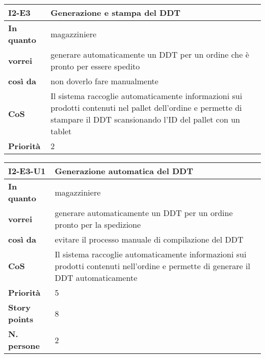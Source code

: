 \begin{table}[H]
  \begin{tabularx}{\textwidth}{lX}
    \toprule
    \textbf{I2-E3} & \textbf{Generazione e stampa del DDT} \\
    \midrule
    \textbf{In quanto} & magazziniere \\
    \textbf{vorrei} & generare automaticamente un DDT per un ordine che è pronto per essere spedito \\
    \textbf{così da} & non doverlo fare manualmente \\
    \midrule
    \textbf{CoS} & Il sistema raccoglie automaticamente informazioni sui prodotti contenuti nel pallet dell'ordine e permette di stampare il DDT scansionando l'ID del pallet con un tablet \\
    \midrule
    \textbf{Priorità} & 2 \\
    \bottomrule
  \end{tabularx}
  \label{user-story:i2-e3}
\end{table}

\begin{table}[H]
  \begin{tabularx}{\textwidth}{lX}
    \toprule
    \textbf{I2-E3-U1} & \textbf{Generazione automatica del DDT} \\
    \midrule
    \textbf{In quanto} & magazziniere \\
    \textbf{vorrei} & generare automaticamente un DDT per un ordine pronto per la spedizione \\
    \textbf{così da} & evitare il processo manuale di compilazione del DDT \\
    \midrule
    \textbf{CoS} & Il sistema raccoglie automaticamente informazioni sui prodotti contenuti nell'ordine e permette di generare il DDT automaticamente \\
    \midrule
    \textbf{Priorità} & 5 \\
    \textbf{Story points} & 8 \\
    \textbf{N. persone} & 2 \\
    \bottomrule
  \end{tabularx}
  \label{user-story:i2-e3-u1}
\end{table}

